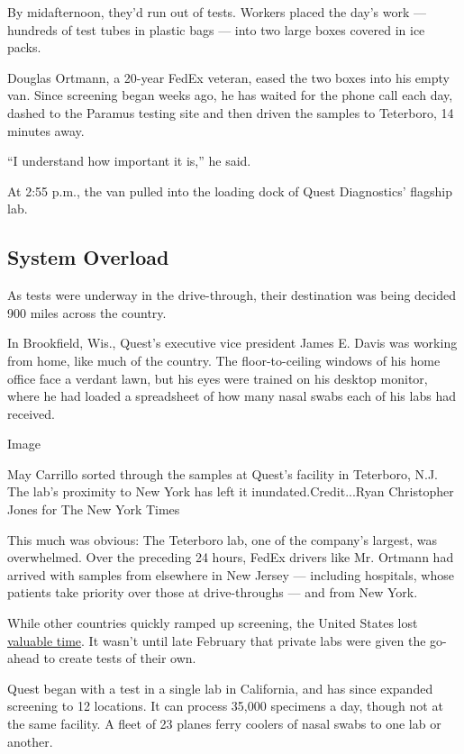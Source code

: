 By midafternoon, they'd run out of tests. Workers placed the day's work
--- hundreds of test tubes in plastic bags --- into two large boxes
covered in ice packs.

Douglas Ortmann, a 20-year FedEx veteran, eased the two boxes into his
empty van. Since screening began weeks ago, he has waited for the phone
call each day, dashed to the Paramus testing site and then driven the
samples to Teterboro, 14 minutes away.

``I understand how important it is,'' he said.

At 2:55 p.m., the van pulled into the loading dock of Quest Diagnostics'
flagship lab.

\hypertarget{system-overload}{%
\subsection{System Overload}\label{system-overload}}

As tests were underway in the drive-through, their destination was being
decided 900 miles across the country.

In Brookfield, Wis., Quest's executive vice president James E. Davis was
working from home, like much of the country. The floor-to-ceiling
windows of his home office face a verdant lawn, but his eyes were
trained on his desktop monitor, where he had loaded a spreadsheet of how
many nasal swabs each of his labs had received.

Image

May Carrillo sorted through the samples at Quest's facility in
Teterboro, N.J. The lab's proximity to New York has left it
inundated.Credit...Ryan Christopher Jones for The New York Times

This much was obvious: The Teterboro lab, one of the company's largest,
was overwhelmed. Over the preceding 24 hours, FedEx drivers like Mr.
Ortmann had arrived with samples from elsewhere in New Jersey ---
including hospitals, whose patients take priority over those at
drive-throughs --- and from New York.

While other countries quickly ramped up screening, the United States
lost
\href{https://www.nytimes3xbfgragh.onion/2020/03/28/us/testing-coronavirus-pandemic.html}{valuable
time}. It wasn't until late February that private labs were given the
go-ahead to create tests of their own.

Quest began with a test in a single lab in California, and has since
expanded screening to 12 locations. It can process 35,000 specimens a
day, though not at the same facility. A fleet of 23 planes ferry coolers
of nasal swabs to one lab or another.

